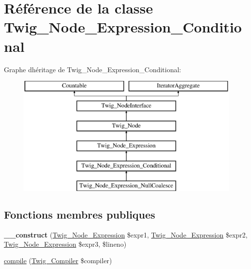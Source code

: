 \hypertarget{class_twig___node___expression___conditional}{}\section{Référence de la classe Twig\+\_\+\+Node\+\_\+\+Expression\+\_\+\+Conditional}
\label{class_twig___node___expression___conditional}
Graphe d\textquotesingle{}héritage de Twig\+\_\+\+Node\+\_\+\+Expression\+\_\+\+Conditional\+:\begin{figure}[H]
\begin{center}
\leavevmode
\includegraphics[height=6.000000cm]{class_twig___node___expression___conditional}
\end{center}
\end{figure}
\subsection*{Fonctions membres publiques}
\begin{DoxyCompactItemize}
\item 
{\bfseries \+\_\+\+\_\+construct} (\hyperlink{class_twig___node___expression}{Twig\+\_\+\+Node\+\_\+\+Expression} \$expr1, \hyperlink{class_twig___node___expression}{Twig\+\_\+\+Node\+\_\+\+Expression} \$expr2, \hyperlink{class_twig___node___expression}{Twig\+\_\+\+Node\+\_\+\+Expression} \$expr3, \$lineno)\hypertarget{class_twig___node___expression___conditional_acbdd637878c47a7554a99e48d8cdac21}{}\label{class_twig___node___expression___conditional_acbdd637878c47a7554a99e48d8cdac21}

\item 
\hyperlink{class_twig___node___expression___conditional_a4e0faa87c3fae583620b84d3607085da}{compile} (\hyperlink{class_twig___compiler}{Twig\+\_\+\+Compiler} \$compiler)
\end{DoxyCompactItemize}
